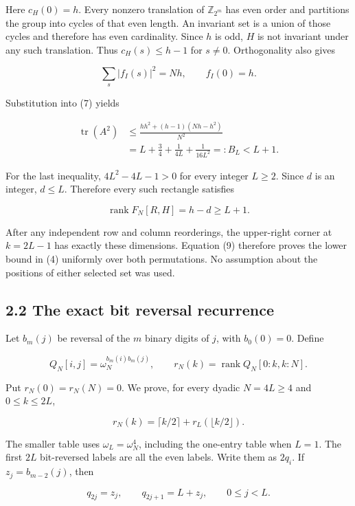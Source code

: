 \documentclass[
  11pt,
  letterpaper,
]{article}
\begin{document}
Here \(c_H(0)=h\). Every nonzero translation of \(\mathbb Z_{2^m}\) has
even order and partitions the group into cycles of that even length. An
invariant set is a union of those cycles and therefore has even
cardinality. Since \(h\) is odd, \(H\) is not invariant under any such
translation. Thus \(c_H(s)\leq h-1\) for \(s\neq0\). Orthogonality also
gives

\[
\sum_s|f_I(s)|^2=Nh,\qquad f_I(0)=h.
\]

Substitution into (7) yields

\[
\begin{aligned}
\operatorname{tr}(A^2)
&\leq\frac{h h^2+(h-1)(Nh-h^2)}{N^2}\\
&=L+\frac34+\frac1{4L}+\frac1{16L^2}=:B_L<L+1.              \end{aligned} \tag{8}
\]

For the last inequality, \(4L^2-4L-1>0\) for every integer \(L\geq2\).
Since \(d\) is an integer, \(d\leq L\). Therefore every such rectangle
satisfies

\[
\operatorname{rank}F_N[R,H]=h-d\geq L+1.                    \tag{9}
\]

After any independent row and column reorderings, the upper-right corner
at \(k=2L-1\) has exactly these dimensions. Equation (9) therefore
proves the lower bound in (4) uniformly over both permutations. No
assumption about the positions of either selected set was used.

\subsection{2.2 The exact bit reversal
recurrence}\label{the-exact-bit-reversal-recurrence}

Let \(b_m(j)\) be reversal of the \(m\) binary digits of \(j\), with
\(b_0(0)=0\). Define

\[
Q_N[i,j]=\omega_N^{b_m(i)b_m(j)},\qquad
r_N(k)=\operatorname{rank}Q_N[0:k,k:N].
\]

Put \(r_N(0)=r_N(N)=0\). We prove, for every dyadic \(N=4L\geq4\) and
\(0\leq k\leq2L\),

\[
r_N(k)=\lceil k/2\rceil+r_L(\lfloor k/2\rfloor).             \tag{10}
\]

The smaller table uses \(\omega_L=\omega_N^4\), including the one-entry
table when \(L=1\). The first \(2L\) bit-reversed labels are all the
even labels. Write them as \(2q_i\). If \(z_j=b_{m-2}(j)\), then

\[
q_{2j}=z_j,\qquad q_{2j+1}=L+z_j,\qquad 0\leq j<L.          \tag{11}
\]
\end{document}
